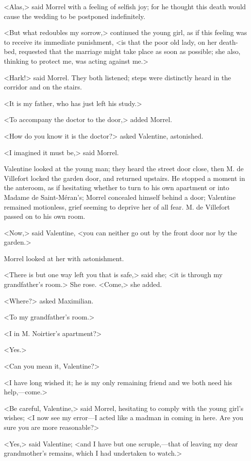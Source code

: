  <Alas,> said Morrel with a feeling of selfish joy; for he thought this death would cause the wedding to be postponed indefinitely. 

 <But what redoubles my sorrow,> continued the young girl, as if this feeling was to receive its immediate punishment, <is that the poor old lady, on her death-bed, requested that the marriage might take place as soon as possible; she also, thinking to protect me, was acting against me.> 

 <Hark!> said Morrel. They both listened; steps were distinctly heard in the corridor and on the stairs. 

 <It is my father, who has just left his study.> 

 <To accompany the doctor to the door,> added Morrel. 

 <How do you know it is the doctor?> asked Valentine, astonished. 

 <I imagined it must be,> said Morrel. 

 Valentine looked at the young man; they heard the street door close, then M. de Villefort locked the garden door, and returned upstairs. He stopped a moment in the anteroom, as if hesitating whether to turn to his own apartment or into Madame de Saint-Méran's; Morrel concealed himself behind a door; Valentine remained motionless, grief seeming to deprive her of all fear. M. de Villefort passed on to his own room. 

 <Now,> said Valentine, <you can neither go out by the front door nor by the garden.> 

 Morrel looked at her with astonishment. 

 <There is but one way left you that is safe,> said she; <it is through my grandfather's room.> She rose. <Come,> she added. 

 <Where?> asked Maximilian. 

 <To my grandfather's room.> 

 <I in M. Noirtier's apartment?> 

 <Yes.> 

 <Can you mean it, Valentine?> 

 <I have long wished it; he is my only remaining friend and we both need his help,—come.> 

 <Be careful, Valentine,> said Morrel, hesitating to comply with the young girl's wishes; <I now see my error—I acted like a madman in coming in here. Are you sure you are more reasonable?> 

 <Yes,> said Valentine; <and I have but one scruple,—that of leaving my dear grandmother's remains, which I had undertaken to watch.> 

